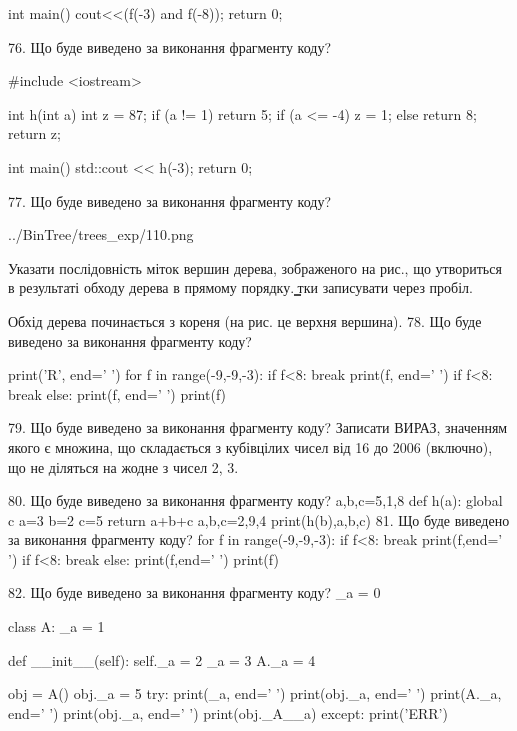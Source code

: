 \documentclass[11pt]{article}
\begin{document}
int main(){
    cout<<(f(-3) and f(-8));
    return 0;
}

76. Що буде виведено за виконання фрагменту коду?

#include <iostream>

int h(int a){
    int z = 87;
    if (a != 1) 
        return 5;
    if (a <= -4)
         z = 1;
    else
         return 8;
    return z;
}

int main(){
    std::cout << h(-3);
    return 0;
}


77. Що буде виведено за виконання фрагменту коду?

\begin{center}
	{../BinTree/trees_exp/110.png}
\end{center}
Указати послідовність міток вершин дерева, зображеного на рис., що утвориться в результаті обходу дерева в прямому порядку. ̳тки записувати через пробіл.\par Обхід дерева починається з кореня (на рис. це верхня вершина).
78. Що буде виведено за виконання фрагменту коду?

print('R', end=' ')
for f in range(-9,-9,-3):
    if f<8:
        break
        print(f, end=' ')
    if f<8:
        break
    else:
        print(f, end=' ')
    print(f)

79. Що буде виведено за виконання фрагменту коду?
Записати ВИРАЗ, значенням якого є множина, що складається з кубівцілих чисел від 16 до 2006 (включно), що не діляться на жодне з чисел 2, 3.

80. Що буде виведено за виконання фрагменту коду?
a,b,c=5,1,8
   def h(a):
     global c     a=3
     b=2
     c=5
     return a+b+c
   a,b,c=2,9,4
   print(h(b),a,b,c)
81. Що буде виведено за виконання фрагменту коду?
for f in range(-9,-9,-3):
    if f<8:
        break
        print(f,end=' ')
    if f<8:
        break
    else:
        print(f,end=' ')
    print(f)

82. Що буде виведено за виконання фрагменту коду?
_a = 0

class A:
    _a = 1
    
    def __init__(self):
        self._a = 2
        _a = 3
        A._a = 4

obj = A()
obj._a = 5
try:
    print(_a, end=' ')
    print(obj._a, end=' ')
    print(A._a, end=' ')
    print(obj._a, end=' ')
    print(obj._A__a)
except:
    print('ERR')
\end{document}
